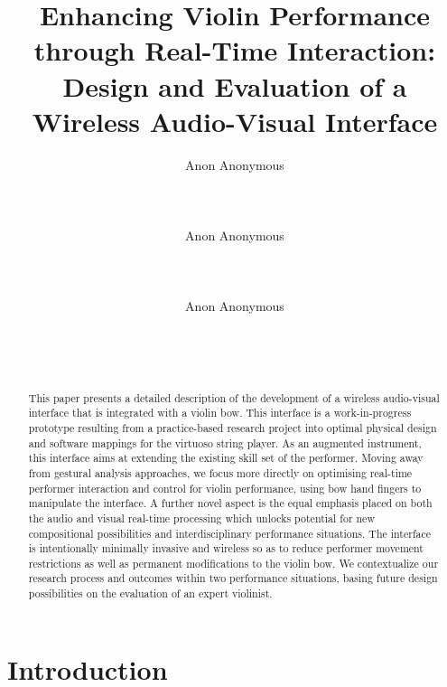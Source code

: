 \documentclass{nime-alternate}
\title{Enhancing Violin Performance through Real-Time Interaction: Design and Evaluation of a Wireless Audio-Visual Interface}
\author{
\alignauthor
Anon Anonymous\\
       \affaddr{\anonymize{Institute for Anonymous}}\\
       \affaddr{\anonymize{1932 Wallamaloo Lane}}\\
       \affaddr{\anonymize{Wallamaloo, New Zealand}}\\
       \email{\anonymize{trovato@corporation.com}}
\alignauthor
Anon Anonymous\\
       \affaddr{\anonymize{Institute for Anonymous}}\\
       \affaddr{\anonymize{1932 Wallamaloo Lane}}\\
       \affaddr{\anonymize{Wallamaloo, New Zealand}}\\
       \email{\anonymize{trovato@corporation.com}}
\alignauthor
Anon Anonymous\\
       \affaddr{\anonymize{Institute for Anonymous}}\\
       \affaddr{\anonymize{1932 Wallamaloo Lane}}\\
       \affaddr{\anonymize{Wallamaloo, New Zealand}}\\
       \email{\anonymize{trovato@corporation.com}}
}
\begin{document}
\maketitle

\begin{abstract}

This paper presents a detailed description of the development of a wireless audio-visual interface that is integrated with a violin bow. 
This interface is a work-in-progress prototype resulting from a practice-based research project into optimal physical design and software mappings for the virtuoso string player.
As an augmented instrument, this interface aims at extending the existing skill set of the performer. Moving away from gestural analysis approaches, we focus more directly on optimising real-time performer interaction and control for violin performance, using bow hand fingers to manipulate the interface. A further novel aspect is the equal emphasis placed on both the audio and visual real-time processing which unlocks potential for new compositional possibilities and interdisciplinary performance situations.
The interface is intentionally minimally invasive and wireless so as to reduce performer movement restrictions as well as permanent modifications to the violin bow. We contextualize our research process and outcomes within two performance situations, basing future design possibilities on the evaluation of an expert violinist.



\end{abstract} 





\printccsdesc


\section{Introduction}

\end{document}

